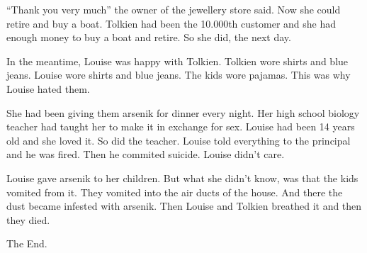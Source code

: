 ``Thank you very much'' the owner of the jewellery store said. Now
she could retire and buy a boat. Tolkien had been the 10.000th
customer and she had enough money to buy a boat and retire. So she
did, the next day.



In the meantime, Louise was happy with Tolkien. Tolkien wore shirts
and blue jeans. Louise wore shirts and blue jeans. The kids wore
pajamas. This was why Louise hated them.



She had been giving them arsenik for dinner every night. Her high
school biology teacher had taught her to make it in exchange for
sex. Louise had been 14 years old and she loved it. So did the
teacher. Louise told everything to the principal and he was fired.
Then he commited suicide. Louise didn't care.



Louise gave arsenik to her children. But what she didn't know, was
that the kids vomited from it. They vomited into the air ducts of
the house. And there the dust became infested with arsenik. Then
Louise and Tolkien breathed it and then they died.



The End. 
 




